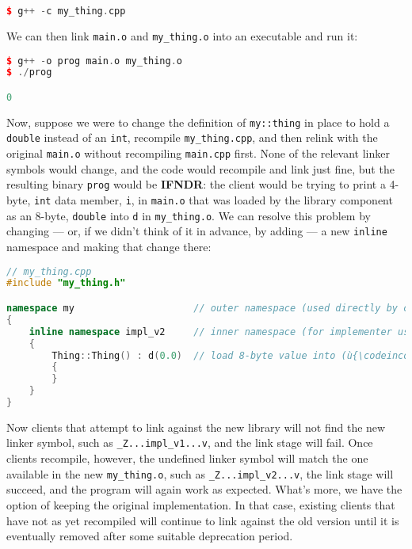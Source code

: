 \begin{lstlisting}[language=C++]
$ g++ -c my_thing.cpp
\end{lstlisting}
    
\noindent We can then link \texttt{main.o} and \texttt{my\_thing.o} into an
executable and run it:

\begin{lstlisting}[language=C++]
$ g++ -o prog main.o my_thing.o
$ ./prog

0
\end{lstlisting}
    
\noindent Now, suppose we were to change the definition of \texttt{my::thing} in
place to hold a \texttt{double} instead of an \texttt{int}, recompile
\texttt{my\_thing.cpp}, and then relink with the original
\texttt{main.o} without recompiling \texttt{main.cpp} first. None of the
relevant linker symbols would change, and the code would recompile and link
just fine, but the resulting binary \texttt{prog} would be
\textbf{IFNDR}: the client would be trying to print a 4-byte,
\texttt{int} data member, \texttt{i}, in \texttt{main.o} that was loaded
by the library component as an 8-byte, \texttt{double} into \texttt{d}
in \texttt{my\_thing.o}. We can resolve this problem by changing --- or,
if we didn't think of it in advance, by adding --- a new \texttt{inline}
namespace and making that change there:

\begin{lstlisting}[language=C++]
// my_thing.cpp
#include "my_thing.h"

namespace my                     // outer namespace (used directly by clients)
{
    inline namespace impl_v2     // inner namespace (for implementer use only)
    {
        Thing::Thing() : d(0.0)  // load 8-byte value into (ù{\codeincomments{Thing}}ù)'s data member
        {
        }
    }
}
\end{lstlisting}
    
\noindent Now clients that attempt to link against the new library will not find
the new linker symbol, such as \texttt{\_Z...impl\_v1...v}, and the link
stage will fail. Once clients recompile, however, the undefined linker
symbol will match the one available in the new \texttt{my\_thing.o},
such as \texttt{\_Z...impl\_v2...v}, the link stage will succeed, and
the program will again work as expected. What's more, we have the option
of keeping the original implementation. In that case, existing clients
that have not as yet recompiled will continue to link against the old
version until it is eventually removed after some suitable deprecation
period.


